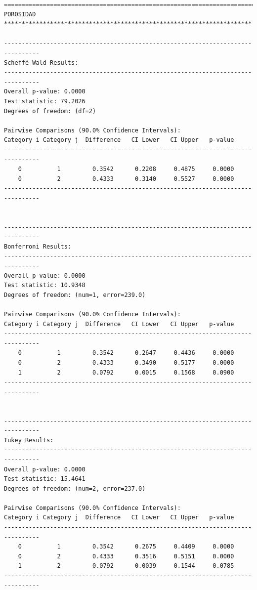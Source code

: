 \begin{lstlisting}
================================================================================
POROSIDAD **********************************************************************

--------------------------------------------------------------------------------
Scheffé-Wald Results:
--------------------------------------------------------------------------------
Overall p-value: 0.0000
Test statistic: 79.2026
Degrees of freedom: (df=2)

Pairwise Comparisons (90.0% Confidence Intervals):
Category i Category j  Difference   CI Lower   CI Upper   p-value  
--------------------------------------------------------------------------------
    0          1         0.3542      0.2208     0.4875     0.0000  
    0          2         0.4333      0.3140     0.5527     0.0000  
--------------------------------------------------------------------------------


--------------------------------------------------------------------------------
Bonferroni Results:
--------------------------------------------------------------------------------
Overall p-value: 0.0000
Test statistic: 10.9348
Degrees of freedom: (num=1, error=239.0)

Pairwise Comparisons (90.0% Confidence Intervals):
Category i Category j  Difference   CI Lower   CI Upper   p-value  
--------------------------------------------------------------------------------
    0          1         0.3542      0.2647     0.4436     0.0000  
    0          2         0.4333      0.3490     0.5177     0.0000  
    1          2         0.0792      0.0015     0.1568     0.0900  
--------------------------------------------------------------------------------


--------------------------------------------------------------------------------
Tukey Results:
--------------------------------------------------------------------------------
Overall p-value: 0.0000
Test statistic: 15.4641
Degrees of freedom: (num=2, error=237.0)

Pairwise Comparisons (90.0% Confidence Intervals):
Category i Category j  Difference   CI Lower   CI Upper   p-value  
--------------------------------------------------------------------------------
    0          1         0.3542      0.2675     0.4409     0.0000  
    0          2         0.4333      0.3516     0.5151     0.0000  
    1          2         0.0792      0.0039     0.1544     0.0785  
--------------------------------------------------------------------------------


\end{lstlisting}

